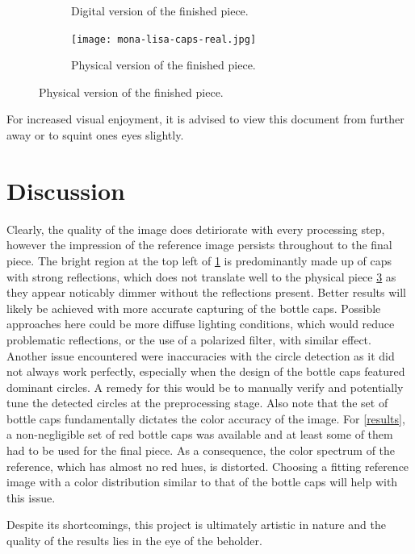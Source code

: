 \documentclass{article}
\begin{document}
\begin{figure}[h]
\begin{subfigure}[t]{0.3\linewidth}
		\caption{Digital version of the finished piece.}
		\label{fig:mona2}
        \end{subfigure}
	\hfill
        \begin{subfigure}[t]{0.3\linewidth}
		\centering
		\texttt{[image: mona-lisa-caps-real.jpg]}
		\caption{Physical version of the finished piece.}
		\label{fig:mona3}
        \end{subfigure}
\end{figure}
For increased visual enjoyment, it is advised to view this document from further away or to squint ones eyes slightly. 

\section{Discussion} \label{discussion}
Clearly, the quality of the image does detiriorate with every processing step, however the impression of the reference image persists throughout to the final piece. 
The bright region at the top left of \ref{fig:mona2} is predominantly made up of caps with strong reflections, which does not translate well to the physical piece \ref{fig:mona3} as they appear noticably dimmer without the reflections present.
Better results will likely be achieved with more accurate capturing of the bottle caps. Possible approaches here could be more diffuse lighting conditions, which would reduce problematic reflections, or the use of a polarized filter, with similar effect.
Another issue encountered were inaccuracies with the circle detection as it did not always work perfectly, especially when the design of the bottle caps featured dominant circles. 
A remedy for this would be to manually verify and potentially tune the detected circles at the preprocessing stage. 
Also note that the set of bottle caps fundamentally dictates the color accuracy of the image. For \ref{results}, a non-negligible set of red bottle caps was available and at least some of them had to be used for the final piece. As a consequence, the color spectrum of the reference, which has almost no red hues, is distorted. Choosing a fitting reference image with a color distribution similar to that of the bottle caps will help with this issue. 

Despite its shortcomings, this project is ultimately artistic in nature and the quality of the results lies in the eye of the beholder.


\end{document}
